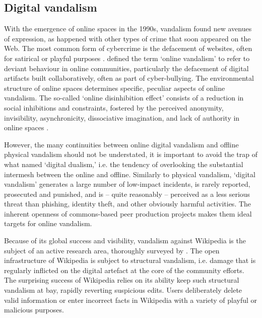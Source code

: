 \documentclass{article} \usepackage{graphicx,xspace}
\begin{document}
\subsection{Digital vandalism}



With the emergence of online spaces in the 1990s, vandalism found new avenues of expression, as happened with other types of crime that soon appeared on the Web.
The most common form of cybercrime is the defacement of websites, often for satirical or playful purposes \citep{furnell:2002:cybercrime}.
\cite{williams:2004:understandingking} defined the term `online vandalism' to refer to deviant behaviour in online communities, particularly the defacement of digital artifacts built collaboratively, often as part of cyber-bullying.
The environmental structure of online spaces determines specific, peculiar aspects of online vandalism.
The so-called `online disinhibition effect' consists of a reduction in social inhibitions and constraints, fostered by the perceived anonymity, invisibility, asynchronicity, dissociative imagination, and lack of authority in online spaces \citep{suler:2004:disinhibition}.

However, the many continuities between online digital vandalism and offline physical vandalism should not be understated, it is important to avoid the trap of what \cite{jurgenson:2012:atomsbits} named `digital dualism,' i.e. the tendency of overlooking the substantial intermesh between the online and offline.
Similarly to physical vandalism, `digital vandalism' generates a large number of low-impact incidents, is rarely reported, prosecuted and punished, and is -- quite reasonably -- perceived as a less serious threat than phishing, identity theft, and other obviously harmful activities.
The inherent openness of commons-based peer production projects makes them ideal targets for online vandalism. 

Because of its global success and visibility, vandalism against Wikipedia is the subject of an active research area, thoroughly surveyed by \cite{nielsen:2012:wikipediasurvey}.
The open infrastructure of Wikipedia is subject to structural vandalism, i.e. damage that is regularly inflicted on the digital artefact at the core of the community efforts.
The surprising success of Wikipedia relies on its ability keep such structural vandalism at bay, rapidly reverting suspicious edits.
Users deliberately delete valid information or enter incorrect facts in Wikipedia with a variety of playful or malicious purposes.
\end{document}
